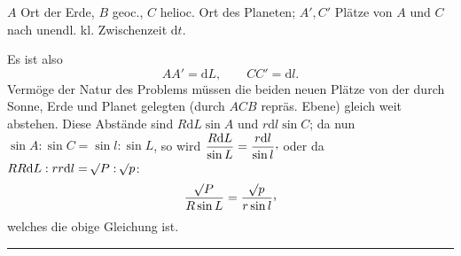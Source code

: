 \(A\) Ort der Erde, \(B\) geoc., \(C\) helioc. Ort des Planeten; \(A',C'\) Plätze von \(A\) und \(C\) nach unendl. kl. Zwischenzeit \(\mathrm{d}t\).

Es ist also
\[
AA'=\mathrm{d}L,\qquad CC'=\mathrm{d}l.
\]
Vermöge der Natur des Problems müssen die beiden neuen Plätze von der durch Sonne, Erde und Planet gelegten (durch \(ACB\) repräs. Ebene) gleich weit abstehen. Diese Abstände sind \(R\mathrm{d}L\sin A\) und \(r\mathrm{d}l\sin C\); da nun \(\sin A:\sin C=\sin l:\sin L\), so wird \(\dfrac{R\mathrm{d}L}{\sin L}=\dfrac{r\mathrm{d}l}{\sin l}\mathpunct{\raisebox{.45ex}{,}}\) oder da \(RR\mathrm{d}L:rr\mathrm{d}l=\mathord{{}^{}\!\surd}P:\mathord{{}^{}\!\surd}p\):
\[
\frac{\BareRoot{P}}{R\sin L}=\frac{\BareRoot{p}}{r\sin l}\mathpunct{\raisebox{.45ex}{,}}
\]
welches die obige Gleichung ist.
\begin{center}\rule{.18\textwidth}{.35pt}\end{center}
